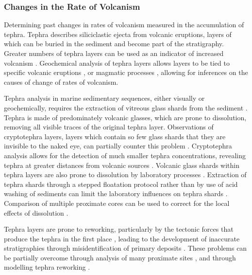 \subsubsection{Changes in the Rate of Volcanism}

Determining past changes in rates of volcanism measured in the accumulation of tephra. Tephra describes siliciclastic ejecta from volcanic eruptions, layers of which can be buried in the sediment and become part of the stratigraphy. Greater numbers of tephra layers can be used as an indicator of increased volcanism \citep{kutterolfMilankovitchFrequenciesTephra2019}. Geochemical analysis of tephra layers allows layers to be tied to specific volcanic eruptions \citep{bourneTephraLatticeGreenland2015}, or magmatic processes \citep{maclennanLinkVolcanismDeglaciation2002}, allowing for inferences on the causes of change of rates of volcanism.

Tephra analysis in marine sedimentary sequences, either visually or geochemically, requires the extraction of vitreous glass shards from the sediment \citep{blockleyNewLessDestructive2005}. Tephra is made of predominately volcanic glasses, which are prone to dissolution, removing all visible traces of the original tephra layer. Observations of cryptotephra layers, layers which contain so few glass shards that they are invisible to the naked eye, can partially counter this problem \citep{daviesCryptotephrasRevolutionCorrelation2015}. Cryptotephra analysis allows for the detection of much smaller tephra concentrations, revealing tephra at greater distances from volcanic sources \citep{wastegardEvidenceOccurrenceVedde1998, mckayAntarcticSouthernOcean2012}. Volcanic glass shards within tephra layers are also prone to dissolution by laboratory processes \citep{blockleyNewLessDestructive2005}. Extraction of tephra shards through a stepped floatation protocol rather than by use of acid washing of sediments can limit the laboratory influences on tephra shards \citep{blockleyNewLessDestructive2005}. Comparison of multiple proximate cores can be used to correct for the local effects of dissolution \citep{abbottTracingMarineCryptotephras2018}.

Tephra layers are prone to reworking, particularly by the tectonic forces that produce the tephra in the first place \citep{nakayamaDepositionalProcessesPrimary1997}, leading to the development of inaccurate stratigraphies through misidentification of primary deposits \citep{hopkinsDepositionPreservationTephra2020}. These problems can be partially overcome through analysis of many proximate sites \citep{abbottTracingMarineCryptotephras2018}, and through modelling tephra reworking \citep{hopkinsDepositionPreservationTephra2020}.













